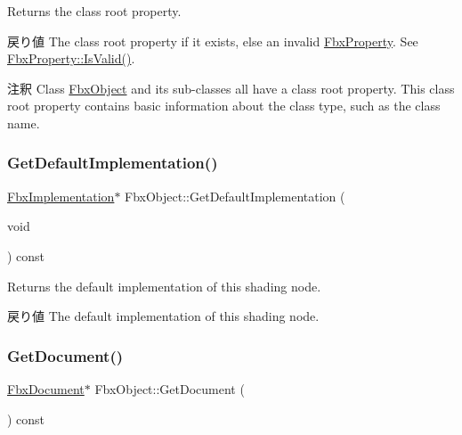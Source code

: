 Returns the class root property. \begin{DoxyReturn}{戻り値}
The class root property if it exists, else an invalid \hyperlink{class_fbx_property}{Fbx\+Property}. See \hyperlink{class_fbx_property_a1c40042c55d1f4a1d4837f06fbc1d764}{Fbx\+Property\+::\+Is\+Valid()}. 
\end{DoxyReturn}
\begin{DoxyRemark}{注釈}
Class \hyperlink{class_fbx_object}{Fbx\+Object} and its sub-\/classes all have a class root property. This class root property contains basic information about the class type, such as the class name. 
\end{DoxyRemark}
\mbox{\label{class_fbx_object_afc23e0f703b4a4e963f3edc95a02c825}} 
\subsubsection{\texorpdfstring{Get\+Default\+Implementation()}{GetDefaultImplementation()}}
{\footnotesize\ttfamily \hyperlink{class_fbx_implementation}{Fbx\+Implementation}$\ast$ Fbx\+Object\+::\+Get\+Default\+Implementation (\begin{DoxyParamCaption}\item[{void}]{ }\end{DoxyParamCaption}) const}

Returns the default implementation of this shading node. \begin{DoxyReturn}{戻り値}
The default implementation of this shading node. 
\end{DoxyReturn}
\mbox{\label{class_fbx_object_a4751c8d1f4156ed658f5b3473cad367a}} 
\subsubsection{\texorpdfstring{Get\+Document()}{GetDocument()}}
{\footnotesize\ttfamily \hyperlink{class_fbx_document}{Fbx\+Document}$\ast$ Fbx\+Object\+::\+Get\+Document (\begin{DoxyParamCaption}{ }\end{DoxyParamCaption}) const}

